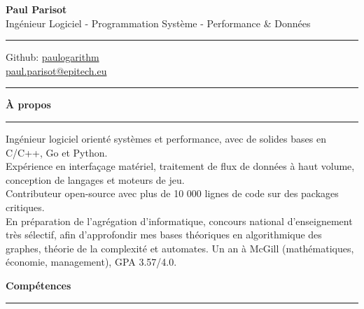 \documentclass[9pt]{extarticle}
\begin{document}
\begin{center}
	{\huge\bfseries Paul Parisot}
	\\[9pt]
	{\Large Ingénieur Logiciel - Programmation Système - Performance \& Données}
	\\
\end{center}


\par\vspace{-5pt}
\rule{\linewidth}{0.4pt}
\par\vspace{-5pt}

\begin{center}
	Github: \href{https://github.com/paulogarithm}{paulogarithm}
	\\
	\href{mailto:paul.parisot@epitech.eu}{paul.parisot@epitech.eu}
	\\
\end{center}

\par\vspace{-10pt}
\rule{\linewidth}{0.4pt}
\par\vspace{7pt}


{\large\bfseries À propos}
\par\vspace{-8pt}
\rule{\linewidth}{0.4pt}
\par\vspace{5pt}

Ingénieur logiciel orienté systèmes et performance, avec de solides bases en C/C++, Go et Python.
\\
Expérience en interfaçage matériel, traitement de flux de données à haut volume, conception de langages et moteurs de jeu.
\\
Contributeur open-source avec plus de 10 000 lignes de code sur des packages critiques.
\\
En préparation de l'agrégation d'informatique, concours national d'enseignement très sélectif, afin d'approfondir mes bases théoriques en algorithmique des graphes, théorie de la complexité et automates. Un an à McGill (mathématiques, économie, management), GPA 3.57/4.0.
\par\vspace{5pt}


{\large\bfseries Compétences}
\par\vspace{-8pt}
\rule{\linewidth}{0.4pt}
\par\vspace{5pt}
\end{document}
